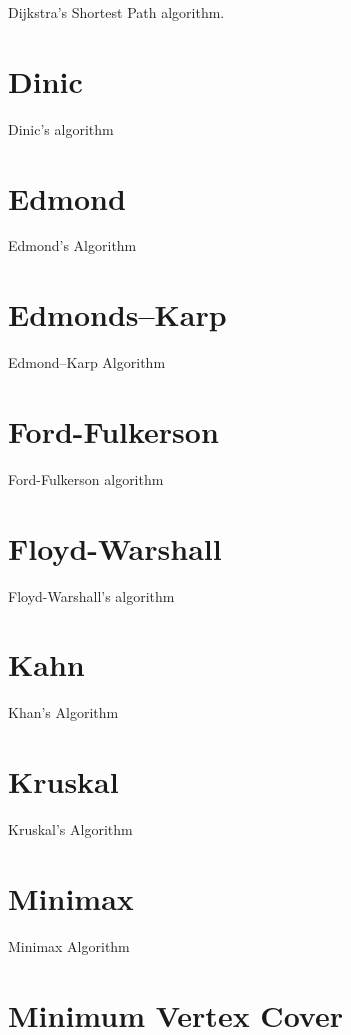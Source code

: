 \documentclass[10pt,oneside]{memoir}
\begin{document}
    Dijkstra's Shortest Path algorithm.

    \section{Dinic}

    Dinic's algorithm

    \section{Edmond}

    Edmond's Algorithm

    \section{Edmonds–Karp}

    Edmond–Karp Algorithm

    \section{Ford-Fulkerson}

    Ford-Fulkerson algorithm

    \section{Floyd-Warshall}

    Floyd-Warshall's algorithm

    \section{Kahn}

    Khan's Algorithm

    \section{Kruskal}

    Kruskal's Algorithm

    \section{Minimax}

    Minimax Algorithm

    \section{Minimum Vertex Cover}
\end{document}
